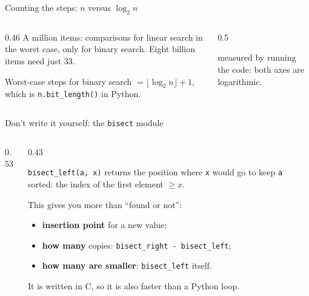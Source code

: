 \documentclass[aspectratio=169,10pt]{beamer}
\begin{document}
\begin{frame}{Counting the steps: $n$ versus $\log_2 n$}
\begin{columns}[T]
\begin{column}{0.46\textwidth}
\vspace{2mm}
{\small A million items:  comparisons for linear search in the worst case, only  for binary search. Eight billion items need just 33.}
\vspace{1mm}

{\footnotesize Worst-case steps for binary search $=\lfloor\log_2 n\rfloor+1$, which is \texttt{n.bit\_length()} in Python.}
\end{column}
\begin{column}{0.5\textwidth}
\begin{sfig}[0.7]
\end{sfig}
{\tiny measured by running the code: both axes are logarithmic.}
\end{column}
\end{columns}
\end{frame}

\begin{frame}{Don't write it yourself: the \texttt{bisect} module}
\begin{columns}[T]
\begin{column}{0.53\textwidth}
\vspace{2mm}
\end{column}
\begin{column}{0.43\textwidth}
{\small
\texttt{bisect\_left(a, x)} returns the position where \texttt{x} would go to keep \texttt{a} sorted: the index of the first element $\geq x$.

\vspace{2mm}
This gives you more than ``found or not'':
\begin{itemize}\setlength\itemsep{2pt}
\item \textbf{insertion point} for a new value;
\item \textbf{how many} copies: \texttt{bisect\_right - bisect\_left};
\item \textbf{how many are smaller}: \texttt{bisect\_left} itself.
\end{itemize}
It is written in C, so it is also faster than a Python loop.}
\end{column}
\end{columns}
\end{frame}
\end{document}
